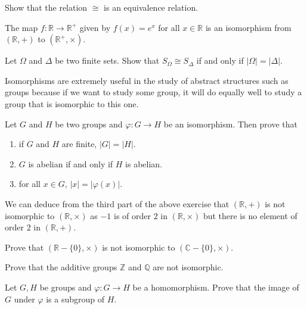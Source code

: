 \begin{exercise}
    Show that the relation $\cong$ is an equivalence relation.
\end{exercise}

\begin{example}
    The map $f:\mathbb{R}\to\mathbb{R}^+$ given by $f(x)=e^x$ for all $x\in\mathbb{R}$ is an isomorphism from $(\mathbb{R},+)$ to $(\mathbb{R}^+,\times)$.
\end{example}

\begin{exercise}
    Let $\Omega$ and $\Delta$ be two finite sets. Show that $S_\Omega\cong S_\Delta$ if and only if $|\Omega|=|\Delta|$.
\end{exercise}

Isomorphisms are extremely useful in the study of abstract structures such as groups because if we want to study some group, it will do equally well to study a group that is isomorphic to this one.

\begin{exercise}
    Let $G$ and $H$ be two groups and $\varphi:G\to H$ be an isomorphism. Then prove that
    \begin{enumerate}
        \item if $G$ and $H$ are finite, $|G|=|H|$.
        \item $G$ is abelian if and only if $H$ is abelian.
        \item for all $x\in G$, $|x|=|\varphi(x)|$.
    \end{enumerate}
\end{exercise}

We can deduce from the third part of the above exercise that $(\mathbb{R},+)$ is not isomorphic to $(\mathbb{R},\times)$ as $-1$ is of order $2$ in $(\mathbb{R},\times)$ but there is no element of order $2$ in $(\mathbb{R},+)$.

\begin{exercise}
    Prove that $(\mathbb{R}-\{0\},\times)$ is not isomorphic to $(\mathbb{C}-\{0\},\times)$.
\end{exercise}
\begin{exercise}
    Prove that the additive groups $\mathbb{Z}$ and $\mathbb{Q}$ are not isomorphic.
\end{exercise}
\begin{exercise}
    Let $G,H$ be groups and $\varphi:G\to H$ be a homomorphism. Prove that the image of $G$ under $\varphi$ is a subgroup of $H$.
\end{exercise}

